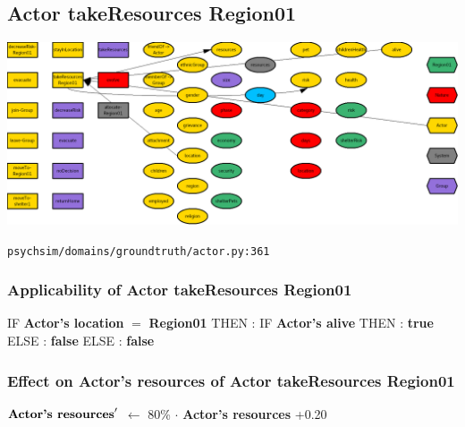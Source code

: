 \documentclass{article}%
\begin{document}
%
\subsection{Actor takeResources Region01}%
\label{subsec:Actor takeResources Region01}%
\includegraphics[width=\textwidth]{images/Actor-takeResources-Region01.png}%
\begin{flushleft}%
\verb|psychsim/domains/groundtruth/actor.py:361|%
\end{flushleft}%
\subsubsection{Applicability of Actor takeResources Region01}%
\label{ssubsec:Applicability of Actor takeResources Region01}%
\begin{flushleft}%
IF %
\textbf{Actor's location}%
$=$%
\textbf{Region01}%
\linebreak%
\hspace*{2em}%
THEN %
: %
IF %
\textbf{Actor's alive}%
\linebreak%
\hspace*{4em}%
THEN %
: %
\textbf{true}%
\linebreak%
\hspace*{4em}%
ELSE %
: %
\textbf{false}%
\linebreak%
\hspace*{2em}%
ELSE %
: %
\textbf{false}%
\end{flushleft}

%
\subsubsection{Effect on Actor's resources of Actor takeResources Region01}%
\label{ssubsec:Effect on Actor's resources of Actor takeResources Region01}%
\begin{flushleft}%
$\mbox{\textbf{Actor's resources}} '$%
$\leftarrow$%
80\%%
$\cdot$%
\textbf{Actor's resources}%
+0.20%
\end{flushleft}
\end{document}
